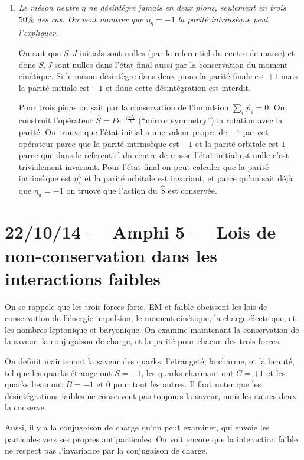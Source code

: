 \documentclass[10pt]{report}
\begin{document}
\begin{enumerate}[1.]
    \item \emph{Le m\'eson neutre $\eta$ ne d\'esint\`egre jamais en deux pions, seulement en trois $50\%$ des cas. On veut montrer que $\eta_\eta = -1$ la parit\'e intrins\`eque peut l'expliquer.}

        On sait que $S, J$ initials sont nulles (par le referentiel du centre de masse) et donc $S,J$ sont nulles dans l'\'etat final aussi par la conservation du moment cin\'etique. Si le m\'eson d\'esint\`egre dans deux pions la parit\'e finale est $+1$ mais la parit\'e initiale est $-1$ et donc cette d\'esint\`egration est interdit.

    Pour trois pions on sait par la conservation de l'impulsion $\sum\limits_{i}^{}\vec{p}_i = 0$. On construit l'op\'erateur $\hat{S} = P e^{-i\frac{\pi J_z}{\hbar}}$ (``mirror symmetry'') la rotation avec la parit\'e. On trouve que l'\'etat initial a une valeur propre de $-1$ par cet op\'erateur parce que la parit\'e intrins\`eque est $-1$ et la parit\'e orbitale est $1$ parce que dans le referentiel du centre de masse l'\'etat initial est nulle c'est trivialement invariant. Pour l'\'etat final on peut calculer que la parit\'e intrins\`eque est $\eta_\pi^3$ et la parit\'e orbitale est invariant, et parce qu'on sait d\'ej\`a que $\eta_\pi = -1$ on truove que l'action du $\hat{S}$ est conserv\'ee.
\end{enumerate}
\chapter{22/10/14 --- Amphi 5 --- Lois de non-conservation dans les interactions faibles}

On se rappele que les trois forces forte, EM et faible obeissent les lois de conservation de l'\'energie-impulsion, le moment cin\'etique, la charge \'electrique, et les nombres leptonique et baryonique. On examine maintenant la conservation de la saveur, la conjugaison de charge, et la parit\'e pour chacun des trois forces.

On definit maintenant la saveur des quarks: l'etranget\'e, la charme, et la beaut\'e, tel que les quarks \'etrange ont $S = -1$, les quarks charmant ont $C = +1$ et les quarks beau ont $B = -1$ et $0$ pour tout les autres. Il faut noter que les d\'esint\'egrations faibles ne conservent pas toujours la saveur, mais les autres deux la conserve.

Aussi, il y a la conjugaison de charge qu'on peut examiner, qui envoie les particules vers ses propres antiparticules. On voit encore que la interaction faible ne respect pas l'invariance par la conjugaison de charge. 
\end{document}
